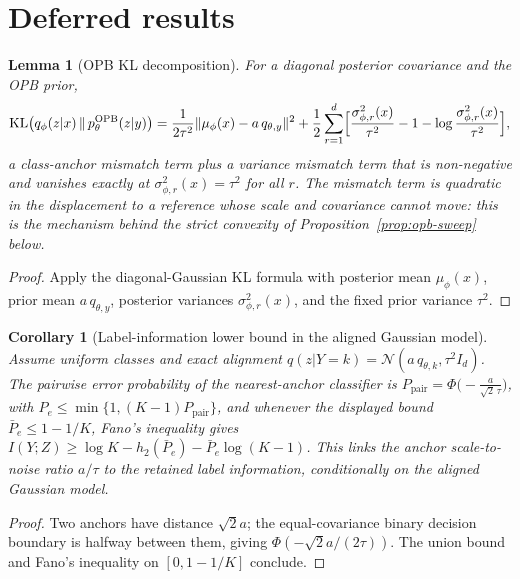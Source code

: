 \documentclass{article}
\theoremstyle{plain}
\newtheorem{lemma}{Lemma}[section]
\newtheorem{corollary}{Corollary}[section]
\theoremstyle{remark}
\DeclareMathOperator{\KL}{KL}
\begin{document}
\section{Deferred results}
\label{app:deferred}

\begin{lemma}[OPB KL decomposition]
\label{lem:opb-kl-decomposition}
For a diagonal posterior covariance and the OPB prior,
\begin{equation}
\KL\bigl(q_\phi(z|x)\,\|\,p_\theta^{\mathrm{OPB}}(z|y)\bigr)
= \frac{1}{2\tau^2}\|\mu_\phi(x) - a\,q_{\theta,y}\|^2
+ \frac12 \sum_{r=1}^{d}\Bigl[
\frac{\sigma_{\phi,r}^2(x)}{\tau^2} - 1 - \log\frac{\sigma_{\phi,r}^2(x)}{\tau^2}
\Bigr],
\end{equation}
a class-anchor mismatch term plus a variance mismatch term that is non-negative and
vanishes exactly at $\sigma_{\phi,r}^2(x) = \tau^2$ for all $r$. The mismatch term is
quadratic in the displacement to a reference whose scale and covariance cannot move:
this is the mechanism behind the strict convexity of
Proposition~\ref{prop:opb-sweep} below.
\end{lemma}

\begin{proof}
Apply the diagonal-Gaussian KL formula with posterior mean $\mu_\phi(x)$, prior mean
$a\,q_{\theta,y}$, posterior variances $\sigma_{\phi,r}^2(x)$, and the fixed prior
variance $\tau^2$.
\end{proof}

\begin{corollary}[Label-information lower bound in the aligned Gaussian model]
\label{cor:opb-fano}
Assume uniform classes and exact alignment
$q(z|Y=k) = \mathcal{N}(a\,q_{\theta,k}, \tau^2 I_d)$. The pairwise error probability
of the nearest-anchor classifier is
$P_{\mathrm{pair}} = \Phi\bigl(-\frac{a}{\sqrt{2}\,\tau}\bigr)$, with
$P_e \le \min\{1, (K-1)P_{\mathrm{pair}}\}$, and whenever the displayed bound
$\bar P_e \le 1 - 1/K$, Fano's inequality gives
$I(Y;Z) \ge \log K - h_2(\bar P_e) - \bar P_e \log(K-1)$. This links the anchor
scale-to-noise ratio $a/\tau$ to the retained label information, conditionally on the
aligned Gaussian model.
\end{corollary}

\begin{proof}
Two anchors have distance $\sqrt{2}a$; the equal-covariance binary decision boundary
is halfway between them, giving $\Phi(-\sqrt{2}a/(2\tau))$. The union bound and
Fano's inequality on $[0, 1-1/K]$ conclude.
\end{proof}
\end{document}
